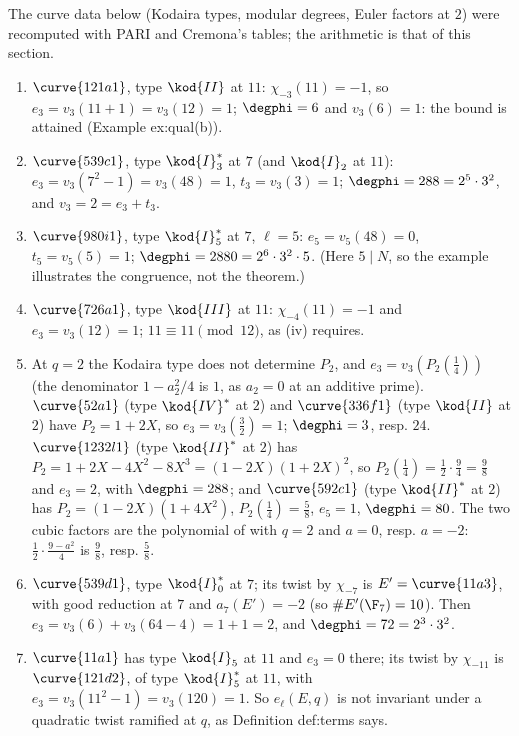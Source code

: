 \begin{example}\label{ex:rings:paper-values}
The curve data below (Kodaira types, modular degrees, Euler factors at $2$) were recomputed with PARI and Cremona's tables; the
arithmetic is that of this section.
\begin{enumerate}[label=(\alph*)]
\item $\curve{121a1}$, type $\kod{II}$ at $11$: $\chi_{-3}(11)=-1$, so $e_3=v_3(11+1)=v_3(12)=1$; $\degphi=6$ and $v_3(6)=1$: the bound is attained (Example ex:qual(b)).
\item $\curve{539c1}$, type $\kod{I}_3^*$ at $7$ (and $\kod{I}_2$ at $11$): $e_3=v_3(7^2-1)=v_3(48)=1$, $t_3=v_3(3)=1$; $\degphi=288=2^5\cdot3^2$, and $v_3=2=e_3+t_3$.
\item $\curve{980i1}$, type $\kod{I}_5^*$ at $7$, $\ell=5$: $e_5=v_5(48)=0$, $t_5=v_5(5)=1$; $\degphi=2880=2^6\cdot3^2\cdot5$. (Here $5\mid N$, so the example illustrates the
congruence, not the theorem.)
\item $\curve{726a1}$, type $\kod{III}$ at $11$: $\chi_{-4}(11)=-1$ and $e_3=v_3(12)=1$; $11\equiv11\pmod{12}$, as (iv) requires.
\item At $q=2$ the Kodaira type does not determine $P_2$, and $e_3=v_3(P_2(\frac14))$ (the denominator $1-a_2^2/4$ is $1$, as $a_2=0$ at an additive
prime). $\curve{52a1}$ (type $\kod{IV}^*$ at $2$) and $\curve{336f1}$ (type $\kod{II}$ at $2$) have $P_2=1+2X$, so $e_3=v_3(\frac32)=1$; $\degphi=3$, resp. $24$. $\curve{1232l1}$
(type $\kod{II}^*$ at $2$) has $P_2=1+2X-4X^2-8X^3=(1-2X)(1+2X)^2$, so $P_2(\frac14)=\frac12\cdot\frac94=\frac98$ and $e_3=2$, with $\degphi=288$; and $\curve{592c1}$ (type
$\kod{II}^*$ at $2$) has $P_2=(1-2X)(1+4X^2)$, $P_2(\frac14)=\frac58$, $e_5=1$, $\degphi=80$. The two cubic factors are the polynomial of
 with $q=2$ and $a=0$, resp. $a=-2$: $\frac12\cdot\frac{9-a^2}4$ is $\frac98$, resp. $\frac58$.
\item $\curve{539d1}$, type $\kod{I}_0^*$ at $7$; its twist by $\chi_{-7}$ is $E'=\curve{11a3}$, with good reduction at $7$ and $a_7(E')=-2$ (so $\#E'(\F_7)=10$). Then
$e_3=v_3(6)+v_3(64-4)=1+1=2$, and $\degphi=72=2^3\cdot3^2$.
\item $\curve{11a1}$ has type $\kod{I}_5$ at $11$ and $e_3=0$ there; its twist by $\chi_{-11}$ is $\curve{121d2}$, of type $\kod{I}_5^*$ at $11$, with $e_3=v_3(11^2-1)=v_3(120)=1$. So
$e_\ell(E,q)$ is not invariant under a quadratic twist ramified at $q$, as Definition def:terms says.
\end{enumerate}
\end{example}

